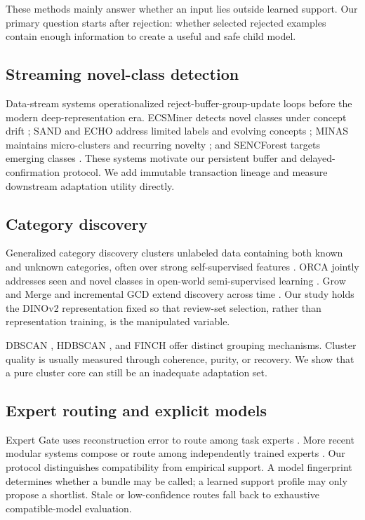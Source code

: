\documentclass[10pt]{article}
\begin{document}
These methods mainly answer whether an input lies outside learned support. Our
primary question starts after rejection: whether selected rejected examples
contain enough information to create a useful and safe child model.

\subsection{Streaming novel-class detection}

Data-stream systems operationalized reject-buffer-group-update loops before
the modern deep-representation era. ECSMiner detects novel classes under
concept drift \cite{masud2011}; SAND and ECHO address limited labels and
evolving concepts \cite{haque2016sand,haque2016echo}; MINAS maintains
micro-clusters and recurring novelty \cite{faria2016}; and SENCForest targets
emerging classes \cite{mu2017}. These systems motivate our persistent buffer
and delayed-confirmation protocol. We add immutable transaction lineage and
measure downstream adaptation utility directly.

\subsection{Category discovery}

Generalized category discovery clusters unlabeled data containing both known
and unknown categories, often over strong self-supervised features
\cite{vaze2022}. ORCA jointly addresses seen and novel classes in open-world
semi-supervised learning \cite{cao2022}. Grow and Merge and incremental GCD
extend discovery across time \cite{zhang2022,zhao2023}. Our study holds the
DINOv2 representation \cite{oquab2024} fixed so that review-set selection,
rather than representation training, is the manipulated variable.

DBSCAN \cite{ester1996}, HDBSCAN \cite{campello2013}, and FINCH
\cite{sarfraz2019} offer distinct grouping mechanisms. Cluster quality is
usually measured through coherence, purity, or recovery. We show that a pure
cluster core can still be an inadequate adaptation set.

\subsection{Expert routing and explicit models}

Expert Gate uses reconstruction error to route among task experts
\cite{aljundi2017}. More recent modular systems compose or route among
independently trained experts \cite{gururangan2021,li2022,huang2024}.
Our protocol distinguishes compatibility from empirical support. A model
fingerprint determines whether a bundle may be called; a learned support
profile may only propose a shortlist. Stale or low-confidence routes fall back
to exhaustive compatible-model evaluation.
\end{document}
